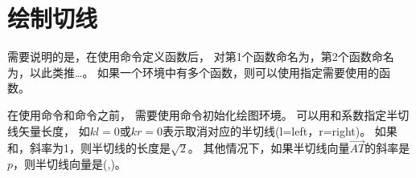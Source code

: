 \documentclass[../main.tex]{subfiles}
\begin{document}
\section{绘制切线}

需要说明的是，在使用命令定义函数后，
对第1个函数命名为，第2个函数命名为，以此类推\ldots。
如果一个环境中有多个函数，则可以使用指定需要使用的函数。

\tkzHandBomb 在使用命令和命令之前，
需要使用命令初始化绘图环境。
可以用和系数指定半切线矢量长度，
如$kl=0$或$kr=0$表示取消对应的半切线(l=left，r=right)。
如果和，斜率为1，则半切线的长度是$\sqrt{2}$。
其他情况下，如果半切线向量$\vec{AT}$的斜率是$p$，则半切线向量是(,)。


\end{document}
